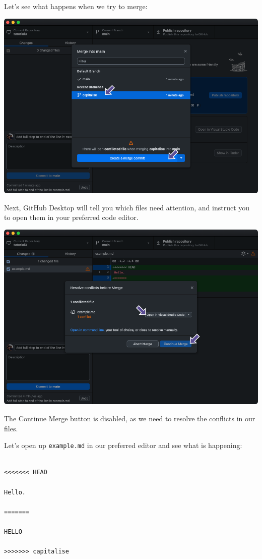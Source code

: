 \documentclass[
  letterpaper,
  DIV=11,
  numbers=noendperiod]{scrartcl}
\begin{document}
Let's see what happens when we try to merge:

\includegraphics{images/image52.png}

Next, GitHub Desktop will tell you which files need attention, and
instruct you to open them in your preferred code editor.

\includegraphics{images/image53.png}

The Continue Merge button is disabled, as we need to resolve the
conflicts in our files.

Let's open up \texttt{example.md} in our preferred editor and see what
is happening:

\begin{verbatim}

<<<<<<< HEAD

Hello.

=======

HELLO

>>>>>>> capitalise
\end{verbatim}
\end{document}
